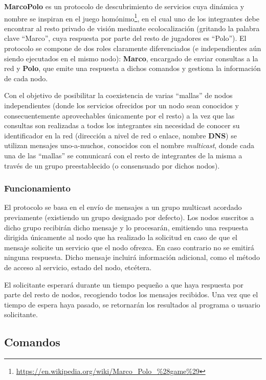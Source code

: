 \textbf{MarcoPolo} es un protocolo de descubrimiento de servicios cuya dinámica y nombre se inspiran en el juego homónimo\footnote{\href{https://en.wikipedia.org/wiki/Marco\_Polo\_\%28game\%29}{https://en.wikipedia.org/wiki/Marco\_Polo\_\%28game\%29}}, en el cual uno de los integrantes debe encontrar al resto privado de visión mediante ecolocalización (gritando la palabra clave ``Marco'', cuya respuesta por parte del resto de jugadores es ``Polo''). El protocolo se compone de dos roles claramente diferenciados (e independientes aún siendo ejecutados en el mismo nodo): \textbf{Marco}, encargado de enviar consultas a la red y \textbf{Polo}, que emite una respuesta a dichos comandos y gestiona la información de cada nodo. %

Con el objetivo de posibilitar la coexistencia de varias ``mallas'' de nodos independientes (donde los servicios ofrecidos por un nodo sean conocidos y consecuentemente aprovechables únicamente por el resto) a la vez que las consultas son realizadas a todos los integrantes sin necesidad de conocer su identificador en la red (dirección a nivel de red o enlace, nombre \textbf{DNS}) se utilizan mensajes uno-a-muchos, conocidos con el nombre \textit{multicast}, donde cada una de las ``mallas'' se comunicará con el resto de integrantes de la misma a través de un grupo preestablecido (o consensuado por dichos nodos).

\subsubsection{Funcionamiento}

El protocolo se basa en el envío de mensajes a un grupo multicast acordado previamente (existiendo un grupo designado por defecto). Los nodos suscritos a dicho grupo recibirán dicho mensaje y lo procesarán, emitiendo una respuesta dirigida únicamente al nodo que ha realizado la solicitud en caso de que el mensaje solicite un servicio que el nodo ofrezca. En caso contrario no se emitirá ninguna respuesta. Dicho mensaje incluirá información adicional, como el método de acceso al servicio, estado del nodo, etcétera.

El solicitante esperará durante un tiempo pequeño a que haya respuesta por parte del resto de nodos, recogiendo todos los mensajes recibidos. Una vez que el tiempo de espera haya pasado, se retornarán los resultados al programa o usuario solicitante.

\subsection{Comandos}

